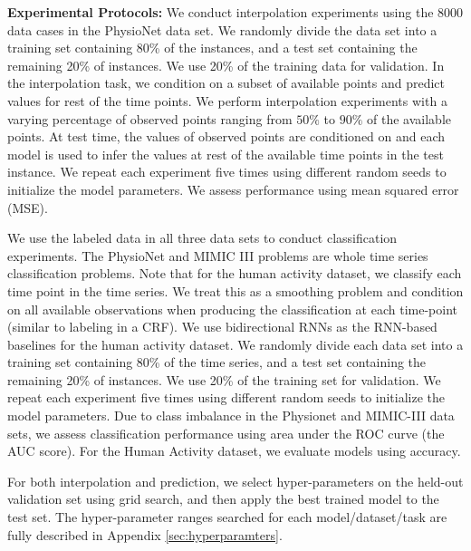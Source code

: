 \textbf{Experimental Protocols:} 
We conduct interpolation experiments using the 8000 data cases in the PhysioNet data set. We randomly divide the data set into a training set containing 80\% of the instances, and a test set containing the remaining 20\% of instances. We use 20\% of the training data for validation.
In the interpolation task, we condition on a subset of available points and predict values for rest of the time points. We perform interpolation experiments with a varying percentage of observed points ranging from $50\%$ to $90\%$ of the available points. At test time, the values of observed points are conditioned on and each model is used to infer the values at rest of the available time points in the test instance. We repeat each experiment five times using different random seeds to initialize the model parameters. We assess performance using mean squared error (MSE).



We use the labeled data in all three data sets to conduct classification experiments. The PhysioNet and MIMIC III problems are whole time series classification problems. Note that for the human activity dataset, we classify each time point in the time series. We treat this as a smoothing problem and condition on all available observations when producing the classification at each time-point (similar to labeling in a CRF). We use bidirectional RNNs as the RNN-based baselines for the human activity dataset. We randomly divide each data set into a training set containing 80\% of the time series,  and a test set containing the remaining 20\% of instances. We use 20\% of the training set for validation. We repeat each experiment five times using different random seeds to initialize the model parameters. Due to class imbalance in the Physionet and MIMIC-III data sets, we assess classification performance using area under the ROC curve (the AUC score). For the Human Activity dataset, we evaluate models using accuracy. 

For both interpolation and prediction, we select hyper-parameters on the held-out validation set using grid search, and then apply the best trained model to the test set. The hyper-parameter ranges searched for each model/dataset/task are fully described in Appendix \ref{sec:hyperparamters}.





